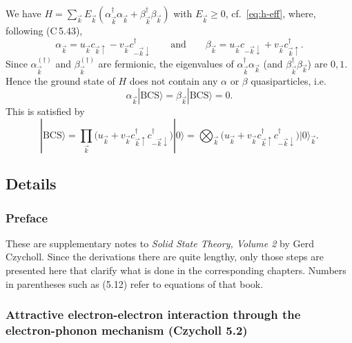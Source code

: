 \documentclass[../../main.tex]{subfiles}
\begin{document}
We have $H=\sum_{\vec k}E_{\vec k}(\alpha^\dagger_{\vec k}\alpha_{\vec k}
+\beta^\dagger_{\vec k}\beta_{\vec k})$ with $E_{\vec k}\ge0$, cf.\ \cref{eq:h-eff}, where,
following (C\,5.43),
\begin{equation}
\alpha_{\vec k} = u_{\vec k}c_{\vec k\uparrow}-v_{\vec k}c^\dagger_{-\vec k\downarrow}
\qquad\text{and}\qquad
\beta_{\vec k} = u_{\vec k}c_{-\vec k\downarrow}+v_{\vec k}c^\dagger_{\vec k\uparrow}.
\label{eq:bogoliubov-ops}
\end{equation}
Since $\alpha^{(\dagger)}_{\vec k}$ and $\beta^{(\dagger)}_{\vec k}$ are
fermionic, the eigenvalues of $\alpha^\dagger_{\vec k}\alpha_{\vec k}$ (and
$\beta^\dagger_{\vec k}\beta_{\vec k}$) are $0,1$. Hence the ground state of $H$ does not
contain any $\alpha$ or $\beta$ quasiparticles, i.e.
\begin{equation}
\alpha_{\vec k}|\mathrm{BCS}\rangle = \beta_{\vec k}|\mathrm{BCS}\rangle = 0 .
\label{eq:quasiparticle-vacuum}
\end{equation}
This is satisfied by
\begin{equation}
|\mathrm{BCS}\rangle
 = \prod_{\vec k}\big(u_{\vec k}
   + v_{\vec k}c^\dagger_{\vec k\uparrow}c^\dagger_{-\vec k\downarrow}\big)|0\rangle
 = \bigotimes_{\vec k}\big(u_{\vec k}
   + v_{\vec k}c^\dagger_{\vec k\uparrow}c^\dagger_{-\vec k\downarrow}\big)
   |0\rangle_{\vec k}.
\label{eq:bcs-state}
\end{equation}


\subsection{Details} \label{subsec:froehlich-to-bcs_details}
\subsubsection{Preface}

These are supplementary notes to \emph{Solid State Theory, Volume 2} by Gerd Czycholl.
Since the derivations there are quite lengthy, only those steps are presented here that
clarify what is done in the corresponding chapters. Numbers in parentheses such as
(5.12) refer to equations of that book.

\subsubsection{Attractive electron-electron interaction through the electron-phonon
mechanism (Czycholl 5.2)}
\label{subsubsec:bcs-el-ph_details}
\end{document}
